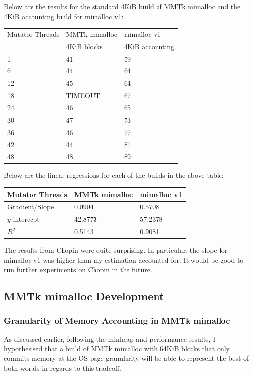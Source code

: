 \documentclass{article}
\begin{document}
Below are the results for the standard 4KiB build of MMTk mimalloc and the 4KiB accounting build for mimalloc v1:
\begin{center}
    \begin{tabular}{|l|l|l|}
        \hline
        Mutator Threads & MMTk mimalloc & mimalloc v1\\
        & 4KiB blocks & 4KiB accounting\\
        \hline
        1 & 41 & 59\\
        \hline
        6 & 44 & 64\\
        \hline
        12 & 45 & 64\\
        \hline
        18 & TIMEOUT & 67\\
        \hline
        24 & 46 & 65\\
        \hline
        30 & 47 & 73\\
        \hline
        36 & 46 & 77\\
        \hline
        42 & 44 & 81\\
        \hline
        48 & 48 & 89\\
        \hline
    \end{tabular}
\end{center}

Below are the linear regressions for each of the builds in the above table:
\begin{center}
    \begin{tabular}{|l|l|l|}
        \hline
        Mutator Threads & MMTk mimalloc & mimalloc v1\\
        \hline
        Gradient/Slope & 0.0904 & 0.5708\\
        \hline
        $y$-intercept & 42.8773 & 57.2378\\
        \hline
        $R^2$ & 0.5143 & 0.9081\\
        \hline
    \end{tabular}
\end{center}

The results from Chopin were quite surprising. In particular, the slope for mimalloc v1 was higher than my estimation accounted for. It would be good to run further experiments on Chopin in the future.

\subsection{MMTk mimalloc Development}
\subsubsection{Granularity of Memory Accounting in MMTk mimalloc}
As discussed earlier, following the minheap and performance results, I hypothesised that a build of MMTk mimalloc with 64KiB blocks that only commits memory at the OS page granularity will be able to represent the best of both worlds in regards to this tradeoff.
\end{document}
